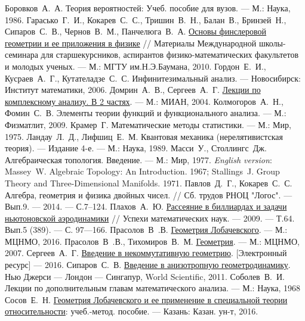 \begin{thebibliography}{199}
 Боровков~А.~А. Теория вероятностей: Учеб. пособие для вузов. --- М.: Наука, 1986.
 Гарасько~Г.~И., Кокарев~С.~С., Тришин~В.~Н., Балан~В., Бринзей~Н., Сипаров~С.~В., Чернов~В.~М., Панчелюга~В.~А.  
\href{http://hypercomplex.xpsweb.com/articles/607/ru/pdf/book_lectures-opt.pdf}{Основы финслеровой геометрии и ее приложения в физике} // Материалы Международной школы-семинара для старшекурсников, аспирантов физико-математических
факультетов и молодых ученых. --- М.: МГТУ им.Н.Э.Баумана, 2010.
 Гордон~Е.~И., Кусраев~А.~Г., Кутателадзе~С.~С. Инфинитезимальный анализ. --- Новосибирск: Институт математики, 2006.
 Домрин~А.~В., Сергеев~А.~Г. \href{http://www.mi-ras.ru/books/pdf/ser1.pdf}{Лекции по комплексному анализу. В 2 частях}. --- М.: МИАН, 2004.
 Колмогоров~А.~Н., Фомин~С.~В. Элементы теории функций и функционального анализа. --- М.: Физматлит, 2009.
 Крамер~Г. Математические методы статистики. --- М.: Мир, 1975.
 Ландау~Л.~Д., Лифшиц~Е.~М. Квантовая механика (нерелятивистская теория). --- Издание 4-е. --- М.: Наука, 1989.
 Масси~У., Столлингс~Дж. Алгебраическая топология. Введение. --- М.: Мир, 1977. \textit{English version}: Massey~W. Algebraic Topology: An Introduction. 1967; Stallings~J. Group Theory and Three-Dimensional Manifolds. 1971.
 Павлов~Д.~Г., Кокарев~С.~С. Алгебра, геометрия и физика двойных чисел. // Сб. трудов РНОЦ "Логос". --- Вып.9. --- 2014. --- С.7--124.
 Плахов~А.~Ю. \href{http://www.etudes.ru/data/localdocs/umn_plahov.pdf}{Рассеяние в биллиардах и задачи ньютоновской аэродинамики} // Успехи математических наук. --- 2009. --- Т.64. Вып.5 (389). --- С. 97—166.
 Прасолов~В~.В. \href{https://yadi.sk/d/teZTJ7wC7L4r2}{Геометрия Лобачевского}. --- М.: МЦНМО, 2016.
 Прасолов~В~.В., Тихомиров~В.~М. \href{http://prasolov.loegria.net/Geometry.pdf}{Геометрия}. --- М.: МЦНМО, 2007.
 Сергеев~А.~Г. \href{http://www.mi-ras.ru/noc/14_15/ncgeom_2016.pdf}{Введение в некоммутативную геометрию}. [Электронный ресурс] --- 2016.
 Сипаров~С.~В. \href{https://siparov.com/sergey-siparov-books/}{Введение в анизотропную геометродинамику}. Нью Джерси --- Лондон --- Сингапур, World Scientific, 2011.
 Соболев~В.~И. Лекции по дополнительным главам математического анализа. --- М.: Наука, 1968
 Сосов~Е.~Н. \href{https://dspace.kpfu.ru/xmlui/bitstream/handle/net/103716/SosovGeomLob!.pdf}{Геометрия Лобачевского и ее применение в специальной теории относительности}: учеб.-метод. пособие. --- Казань: Казан. ун-т, 2016.

\end{thebibliography}
